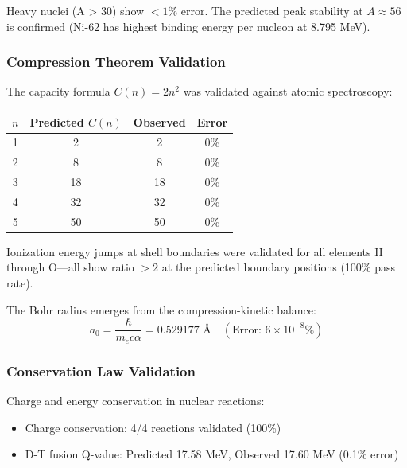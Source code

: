 \documentclass[twocolumn,10pt,a4paper]{article}
\theoremstyle{definition}
\theoremstyle{remark}
\begin{document}
Heavy nuclei (A > 30) show $<1\%$ error. The predicted peak stability at $A \approx 56$ is confirmed (Ni-62 has highest binding energy per nucleon at 8.795 MeV).

\subsubsection{Compression Theorem Validation}

The capacity formula $C(n) = 2n^2$ was validated against atomic spectroscopy:

\begin{center}
\begin{tabular}{cccc}
\toprule
$n$ & Predicted $C(n)$ & Observed & Error \\
\midrule
1 & 2 & 2 & 0\% \\
2 & 8 & 8 & 0\% \\
3 & 18 & 18 & 0\% \\
4 & 32 & 32 & 0\% \\
5 & 50 & 50 & 0\% \\
\bottomrule
\end{tabular}
\end{center}

Ionization energy jumps at shell boundaries were validated for all elements H through O---all show ratio $>2$ at the predicted boundary positions (100\% pass rate).

The Bohr radius emerges from the compression-kinetic balance:
\begin{equation}
    a_0 = \frac{\hbar}{m_e c \alpha} = 0.529177 \text{ \AA} \quad (\text{Error: } 6 \times 10^{-8}\%)
\end{equation}

\subsubsection{Conservation Law Validation}

Charge and energy conservation in nuclear reactions:
\begin{itemize}
    \item Charge conservation: 4/4 reactions validated (100\%)
    \item D-T fusion Q-value: Predicted 17.58 MeV, Observed 17.60 MeV (0.1\% error)
\end{itemize}
\end{document}
